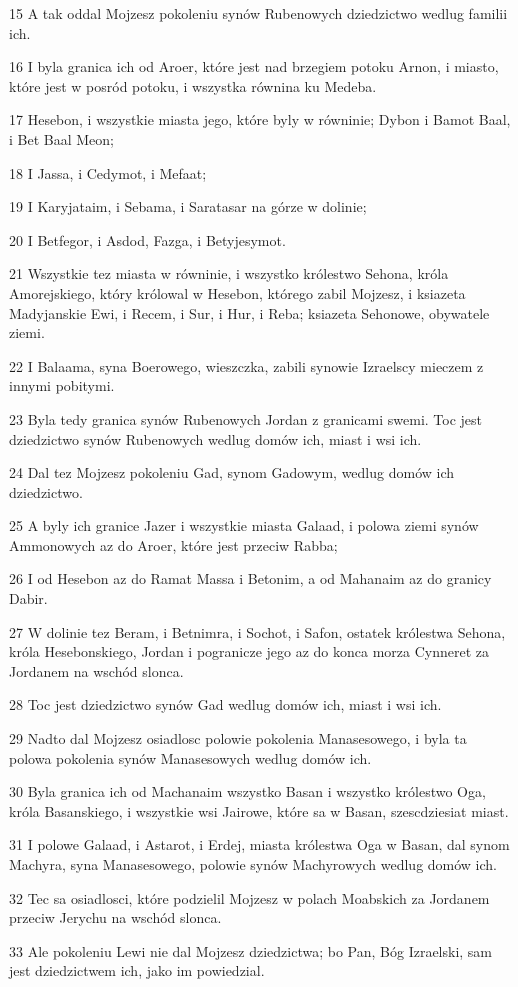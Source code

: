 \par 15 A tak oddal Mojzesz pokoleniu synów Rubenowych dziedzictwo wedlug familii ich.
\par 16 I byla granica ich od Aroer, które jest nad brzegiem potoku Arnon, i miasto, które jest w posród potoku, i wszystka równina ku Medeba.
\par 17 Hesebon, i wszystkie miasta jego, które byly w równinie; Dybon i Bamot Baal, i Bet Baal Meon;
\par 18 I Jassa, i Cedymot, i Mefaat;
\par 19 I Karyjataim, i Sebama, i Saratasar na górze w dolinie;
\par 20 I Betfegor, i Asdod, Fazga, i Betyjesymot.
\par 21 Wszystkie tez miasta w równinie, i wszystko królestwo Sehona, króla Amorejskiego, który królowal w Hesebon, którego zabil Mojzesz, i ksiazeta Madyjanskie Ewi, i Recem, i Sur, i Hur, i Reba; ksiazeta Sehonowe, obywatele ziemi.
\par 22 I Balaama, syna Boerowego, wieszczka, zabili synowie Izraelscy mieczem z innymi pobitymi.
\par 23 Byla tedy granica synów Rubenowych Jordan z granicami swemi. Toc jest dziedzictwo synów Rubenowych wedlug domów ich, miast i wsi ich.
\par 24 Dal tez Mojzesz pokoleniu Gad, synom Gadowym, wedlug domów ich dziedzictwo.
\par 25 A byly ich granice Jazer i wszystkie miasta Galaad, i polowa ziemi synów Ammonowych az do Aroer, które jest przeciw Rabba;
\par 26 I od Hesebon az do Ramat Massa i Betonim, a od Mahanaim az do granicy Dabir.
\par 27 W dolinie tez Beram, i Betnimra, i Sochot, i Safon, ostatek królestwa Sehona, króla Hesebonskiego, Jordan i pogranicze jego az do konca morza Cynneret za Jordanem na wschód slonca.
\par 28 Toc jest dziedzictwo synów Gad wedlug domów ich, miast i wsi ich.
\par 29 Nadto dal Mojzesz osiadlosc polowie pokolenia Manasesowego, i byla ta polowa pokolenia synów Manasesowych wedlug domów ich.
\par 30 Byla granica ich od Machanaim wszystko Basan i wszystko królestwo Oga, króla Basanskiego, i wszystkie wsi Jairowe, które sa w Basan, szescdziesiat miast.
\par 31 I polowe Galaad, i Astarot, i Erdej, miasta królestwa Oga w Basan, dal synom Machyra, syna Manasesowego, polowie synów Machyrowych wedlug domów ich.
\par 32 Tec sa osiadlosci, które podzielil Mojzesz w polach Moabskich za Jordanem przeciw Jerychu na wschód slonca.
\par 33 Ale pokoleniu Lewi nie dal Mojzesz dziedzictwa; bo Pan, Bóg Izraelski, sam jest dziedzictwem ich, jako im powiedzial.

